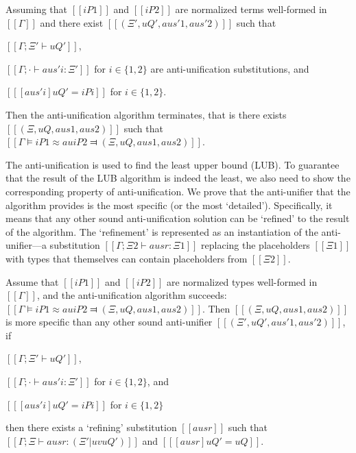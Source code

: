 \begin{lemma*}
    \label{lemma:au-completeness}
    Assuming that $[[iP1]]$ and $[[iP2]]$ are normalized terms well-formed in $[[Γ]]$
    and there exist  $[[(Ξ', uQ', aus'1, aus'2)]]$ such that
    \begin{enumerate*}
        \item $[[Γ ; Ξ' ⊢ uQ']]$,
        \item $[[Γ ; · ⊢ aus'i : Ξ']]$ for $i \in \{1,2\}$ 
        are anti-unification substitutions, and
        \item $[[ [aus'i] uQ' = iPi ]]$ for $i \in \{1,2\}$.
    \end{enumerate*}

    Then the anti-unification algorithm terminates, that is there exists
    $[[(Ξ, uQ, aus1, aus2)]]$ such that $[[Γ ⊨ iP1 ≈au iP2 ⫤ (Ξ, uQ, aus1, aus2)]]$.
\end{lemma*}

The anti-unification is used to find the least upper bound (LUB).
To guarantee that the result of the LUB algorithm is indeed the least, 
we also need to show the corresponding property of anti-unification.
We prove that the anti-unifier that the algorithm provides 
is the most specific (or the most `detailed'). Specifically, 
it means that any other sound anti-unification solution 
can be `refined' to the result of the algorithm.  
The `refinement' is represented as an instantiation of the anti-unifier---a 
substitution $[[Γ ; Ξ2 ⊢ ausr : Ξ1]]$ replacing the placeholders $[[Ξ1]]$ with
types that themselves can contain placeholders from $[[Ξ2]]$.


\begin{lemma*}
        Assume that $[[iP1]]$ and $[[iP2]]$ are normalized types well-formed in $[[Γ]]$, 
        and the anti-unification algorithm succeeds: $[[Γ ⊨ iP1 ≈au iP2 ⫤ (Ξ, uQ, aus1, aus2)]]$. 
        Then $[[(Ξ, uQ, aus1, aus2)]]$ is more specific than
        any other sound anti-unifier $[[(Ξ', uQ', aus'1, aus'2)]]$, \ie if
        \begin{enumerate*}
            \item $[[Γ ; Ξ' ⊢ uQ']]$,
            \item $[[Γ ; · ⊢ aus'i : Ξ']]$ for $i \in \{1,2\}$, and
            \item $[[ [aus'i] uQ' = iPi ]]$ for $i \in \{1,2\}$
        \end{enumerate*}
        then there exists a `refining' substitution $[[ausr]]$ such that
        $[[Γ ; Ξ ⊢ ausr : (Ξ' | uv uQ')]]$ and $[[ [ausr] uQ' = uQ ]]$. 
\end{lemma*}

